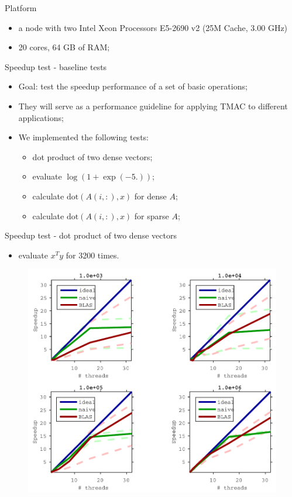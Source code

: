 \documentclass[hyperref,handout,compress,9pt,mathserif]{beamer}
\begin{document}
\begin{frame} {Platform}
\begin{itemize}
\item a node with two Intel Xeon Processors E5-2690 v2 (25M Cache, 3.00 GHz)
\item 20 cores, 64 GB of RAM;
\end{itemize}


\end{frame}


\begin{frame}{Speedup test - baseline tests}
\begin{itemize}
\item Goal: test the speedup performance of a set of basic operations;
\item They will serve as a performance guideline for applying TMAC to different applications;
\item We implemented the following tests:
\begin{itemize}
\item dot product of two dense vectors;
\item evaluate $\log(1 + \exp(-5.))$;
\item calculate $\text{dot}(A(i, :), x)$ for dense $A$;
\item calculate $\text{dot}(A(i, :), x)$ for sparse $A$; 

\end{itemize}
\end{itemize}

\end{frame}

\begin{frame}{Speedup test - dot product of two dense vectors}
\begin{itemize}
\item evaluate $x^T y$ for 3200 times.
\end{itemize}


\begin{figure}[!h]
        \centering
                \includegraphics[width=.8\textwidth]{./figs/ds_vec_dot_prod_cropped.pdf}
\end{figure}

\end{frame}
\end{document}
